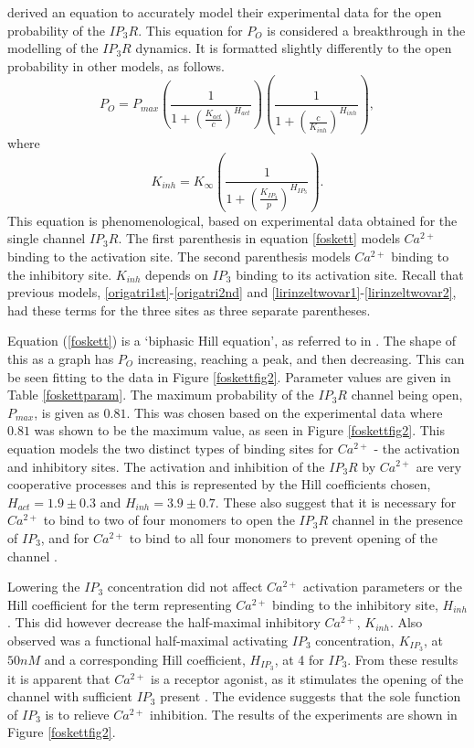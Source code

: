  derived an equation to accurately model their experimental data for the open probability of the $IP_3R$. This equation for $P_O$ is considered a breakthrough in the modelling of the $IP_3R$ dynamics. It is formatted slightly differently to the open probability in other models, as follows. 
\begin{equation}
    P_O=P_{max}{\left(\frac{1}{1+\left(\frac{K_{act}}{c}\right)^{H_{act}}}\right)}{\left(\frac{1}{1+\left(\frac{c}{K_{inh}}\right)^{H_{inh}}}\right)},\label{foskett}
\end{equation}
where
\begin{equation}
    K_{inh}=K_{\infty}\left(\frac{1}{1+\left(\frac{K_{IP_3}}{p}\right)^{H_{IP_3}}}\right).\label{kinheqn}
\end{equation}
{This equation is phenomenological, based on experimental data obtained for the single channel $IP_3R$. }The first parenthesis in equation \eqref{foskett} models $Ca^{2+}$ binding to the activation site. The second parenthesis models $Ca^{2+}$ binding to the inhibitory site. $K_{inh}$ depends on $IP_3$ binding to its activation site. Recall that previous models, \eqref{origatri1st}-\eqref{origatri2nd} and \eqref{lirinzeltwovar1}-\eqref{lirinzeltwovar2}, had these terms for the three sites as three separate parentheses.

Equation (\ref{foskett}) is a `biphasic Hill equation', as referred to in . The shape of this as a graph has $P_O$ increasing, reaching a peak, and then decreasing. This can be seen fitting to the data in Figure \ref{foskettfig2}.  Parameter values are given in Table \ref{foskettparam}. The maximum probability of the $IP_3R$ channel being open, $P_{max}$, is given as {$0.81$}. This was chosen based on the experimental data where $0.81$ was shown to be the maximum value, as seen in Figure \ref{foskettfig2}. This equation models the two distinct types of binding sites for $Ca^{2+}$ - the activation and inhibitory sites. The activation and inhibition of the $IP_3R$ by $Ca^{2+}$ are very cooperative processes and this is represented by the Hill coefficients chosen, $H_{act}=1.9 \pm 0.3$ and $H_{inh}=3.9 \pm 0.7$. These also suggest that it is necessary for $Ca^{2+}$ to bind to two of four monomers to open the $IP_3R$ channel in the presence of $IP_3$, and for $Ca^{2+}$ to bind to all four monomers to prevent opening of the channel \cite{Mak1998}.

Lowering the $IP_3$ concentration did not affect $Ca^{2+}$ activation parameters or the Hill coefficient for the term representing $Ca^{2+}$ binding to the inhibitory site, $H_{inh}$. This did however decrease the half-maximal inhibitory $Ca^{2+}$, $K_{inh}$. Also observed was a functional half-maximal activating $IP_3$ concentration, $K_{IP_3}$, at $50nM$ and a corresponding Hill coefficient, $H_{IP_3}$, at 4 for $IP_3$. From these results it is apparent that $Ca^{2+}$ is a receptor agonist{, as it stimulates the opening of the channel with sufficient $IP_3$ present} \cite{Berridge2000}. The evidence suggests that the sole function of $IP_3$ is to relieve $Ca^{2+}$ inhibition. The results of the experiments are shown in Figure \ref{foskettfig2}. 

